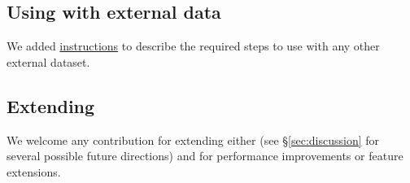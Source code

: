 \subsection{Using \ourtool with external data}
We added \href{https://github.com/softsys4ai/unicorn/blob/master/artifact/OTHERS.md}{\color{blue!80}instructions} to describe the required steps to use \ourtool with any other external dataset.

\subsection{Extending \ourtool}
We welcome any contribution for extending either \ourapproach (see \S\ref{sec:discussion} for several possible future directions) and \ourtool for performance improvements or feature extensions.  



